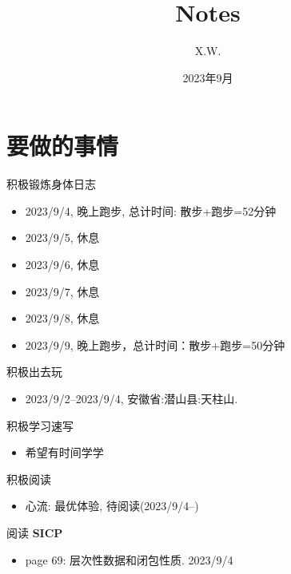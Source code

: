\documentclass[a4,10pt]{ctexart}
\begin{document}
\title{Notes}
\author{X.W.}
\date{2023年9月}
\maketitle
\tableofcontents
\newpage
{}
\newpage


\section{要做的事情}

\begin{yd}{积极锻炼身体日志}{}
	\begin{itemize}[noitemsep]
		\item 2023/9/4, 晚上跑步, 总计时间: 散步+跑步=52分钟
		\item 2023/9/5, 休息
		\item 2023/9/6, 休息
		\item 2023/9/7, 休息
		\item 2023/9/8, 休息
		\item 2023/9/9, 晚上跑步，总计时间：散步+跑步=50分钟
	\end{itemize}
\end{yd}

\begin{yd}{积极出去玩}{}
	\begin{itemize}[noitemsep]
		\item 2023/9/2--2023/9/4, 安徽省:潜山县:天柱山.
	\end{itemize}
\end{yd}

\begin{yd}{积极学习速写}{}
	\begin{itemize}[noitemsep]
		\item 希望有时间学学
	\end{itemize}
\end{yd}

\begin{yd}{积极阅读}{}
	\begin{itemize}[noitemsep]
		\item 心流: 最优体验, 待阅读(2023/9/4--)
	\end{itemize}
\end{yd}


\begin{yd}{阅读 \textbf{SICP}}{}
	\begin{itemize}[noitemsep]
		\item page 69: 层次性数据和闭包性质. 2023/9/4
	\end{itemize}
\end{yd}
\end{document}
